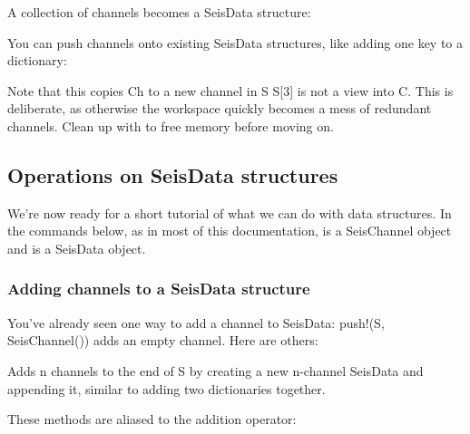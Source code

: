 \documentclass[letterpaper,11pt,english]{sphinxmanual}
\begin{document}
A collection of channels becomes a SeisData structure:


\begin{fulllineitems}
\end{fulllineitems}


You can push channels onto existing SeisData structures, like adding one key
to a dictionary:


\begin{fulllineitems}
\end{fulllineitems}


Note that this copies Ch to a new channel in S \textendash{} S{[}3{]} is not a view into C.
This is deliberate, as otherwise the workspace quickly becomes a mess of
redundant channels. Clean up with  to free memory before moving on.


\subsection{Operations on SeisData structures}
\label{\detokenize{src/tutorial:operations-on-seisdata-structures}}
We’re now ready for a short tutorial of what we can do with data structures.
In the commands below, as in most of this documentation,  is a
SeisChannel object and  is a SeisData object.


\subsubsection{Adding channels to a SeisData structure}
\label{\detokenize{src/tutorial:adding-channels-to-a-seisdata-structure}}
You’ve already seen one way to add a channel to SeisData: push!(S, SeisChannel())
adds an empty channel. Here are others:


\begin{fulllineitems}
\end{fulllineitems}


Adds n channels to the end of S by creating a new n-channel SeisData and
appending it, similar to adding two dictionaries together.

These methods are aliased to the addition operator:
\end{document}
